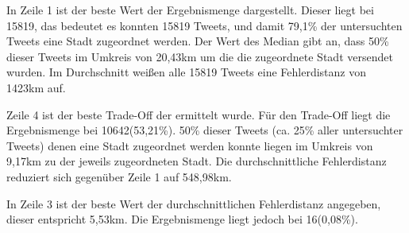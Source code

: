 				In Zeile 1 ist der beste Wert der Ergebnismenge dargestellt.
				Dieser liegt bei 15819, das bedeutet es konnten 15819 Tweets, und damit 79,1\% der untersuchten Tweets eine Stadt zugeordnet werden.
				Der Wert des Median gibt an, dass 50\% dieser Tweets im Umkreis von 20,43km um die die zugeordnete Stadt versendet wurden.
				Im Durchschnitt weißen alle 15819 Tweets eine Fehlerdistanz von 1423km auf.

				Zeile 4 ist der beste Trade-Off der ermittelt wurde.
				Für den Trade-Off liegt die Ergebnismenge bei 10642(53,21\%).
				50\% dieser Tweets (ca. 25\% aller untersuchter Tweets) denen eine Stadt zugeordnet werden konnte liegen im Umkreis von 9,17km zu der jeweils zugeordneten Stadt.
				Die durchschnittliche Fehlerdistanz reduziert sich gegenüber Zeile 1 auf 548,98km. 

				In Zeile 3 ist der beste Wert der durchschnittlichen Fehlerdistanz angegeben, dieser entspricht 5,53km.
				Die Ergebnismenge liegt jedoch bei 16(0,08\%).

